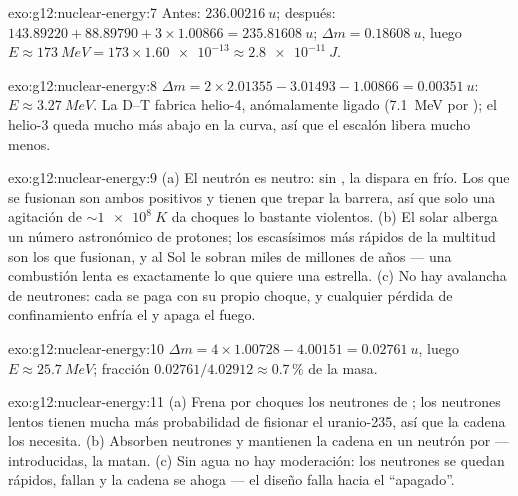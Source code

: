 \begin{solution}{exo:g12:nuclear-energy:7}
Antes: $\qty{236.00216}{u}$; después:
$143.89220 + 88.89790 + 3 \times 1.00866 = \qty{235.81608}{u}$;
$\Delta m = \qty{0.18608}{u}$, luego
$E \approx \qty{173}{MeV} = 173 \times \num{1.60e-13} \approx
\qty{2.8e-11}{J}$.
\end{solution}

\begin{solution}{exo:g12:nuclear-energy:8}
$\Delta m = 2 \times 2.01355 - 3.01493 - 1.00866 = \qty{0.00351}{u}$:
$E \approx \qty{3.27}{MeV}$. La D--T fabrica helio-4, anómalamente
ligado (\qty{7.1}{MeV} por ); el helio-3 queda mucho más abajo en
la curva, así que el escalón libera mucho menos.
\end{solution}

\begin{solution}{exo:g12:nuclear-energy:9}
(a) El neutrón es neutro: sin , la  dispara en
frío. Los  que se fusionan son ambos positivos y tienen que
trepar la barrera, así que solo una agitación de $\sim \qty{1e8}{K}$ da
choques lo bastante violentos. (b) El  solar alberga un número
astronómico de protones; los escasísimos más rápidos de la multitud son
los que fusionan, y al Sol le sobran miles de millones de años --- una
combustión lenta es exactamente lo que quiere una estrella. (c) No hay
avalancha de neutrones: cada  se paga con su propio choque, y
cualquier pérdida de confinamiento enfría el  y apaga el fuego.
\end{solution}

\begin{solution}{exo:g12:nuclear-energy:10}
$\Delta m = 4 \times 1.00728 - 4.00151 = \qty{0.02761}{u}$, luego
$E \approx \qty{25.7}{MeV}$; fracción
$0.02761/4.02912 \approx 0.7\,\%$ de la masa.
\end{solution}

\begin{solution}{exo:g12:nuclear-energy:11}
(a) Frena por choques los neutrones de ; los neutrones lentos
tienen mucha más probabilidad de fisionar el uranio-235, así que la
cadena los necesita. (b) Absorben neutrones y mantienen la cadena en un
neutrón por  --- introducidas, la matan. (c) Sin agua no hay
moderación: los neutrones se quedan rápidos, fallan y la cadena se
ahoga --- el diseño falla hacia el ``apagado''.
\end{solution}

